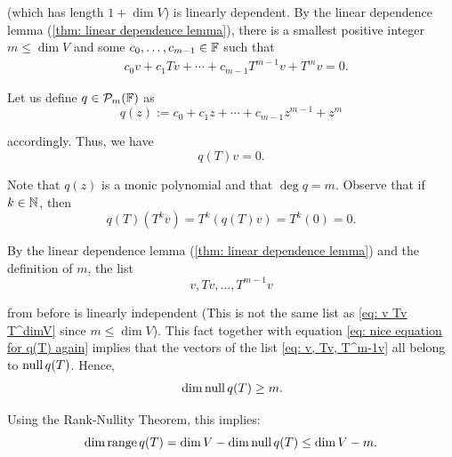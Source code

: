 \begin{prf}
  (which has length $1+\dim V$) is linearly dependent.
  By the linear dependence lemma (\ref{thm: linear dependence lemma}), there is a smallest positive integer $m\leq \dim V$ and some $c_0, \ldots, c_{m-1} \in \mathbb{F}$ such that
  \begin{equation}
    \begin{aligned}
      &c_0 v + c_1 Tv + \cdots + c_{m-1} T^{m-1} v + T^m v = 0.
    \end{aligned}
  \end{equation}

  Let us define $q \in \mathcal{P}_m (\mathbb{F})$ as
  \begin{equation}
    q(z) := c_0 + c_1z + \cdots + c_{m-1} z^{m-1} +z^{m}
  \end{equation}

  accordingly. Thus, we have
  \begin{equation}
    q(T) v=0.
  \end{equation}

  Note that $q(z)$ is a monic polynomial and that $\deg q = m$. Observe that if $k \in \mathbb{N}$, then
  \begin{equation}
    \label{eq: nice equation for q(T) again}
    q(T)(T^kv)=T^k(q(T)v) =T^k (0) =0.
  \end{equation}

  By the linear dependence lemma (\ref{thm: linear dependence lemma}) and the definition of $m$, the list
  \begin{equation}
    \label{eq: v, Tv, T^m-1v}
    v, Tv, \dots, T^{m-1}v
  \end{equation}

  from before is linearly independent (This is not the same list as \eqref{eq: v Tv T^dimV} since $m \leq \dim V$). This fact together with equation \eqref{eq: nice equation for q(T) again} implies that the vectors of the list \eqref{eq: v, Tv, T^m-1v} all belong to $\operatorname{null} q(T)$. Hence,
  \begin{equation}
    \begin{aligned}
      &\dim \operatorname{null} q(T)   \geq m. \\
    \end{aligned}
  \end{equation}

  Using the Rank-Nullity Theorem, this implies:
  \begin{equation}
    \dim \operatorname{range} q(T)  = \dim V - \dim \operatorname{null} q(T) \leq \dim V - m.
  \end{equation}


\end{prf}
